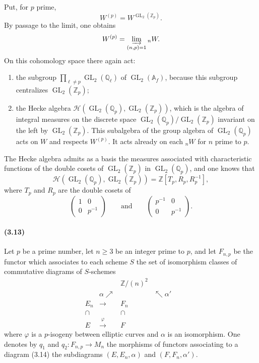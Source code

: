 \documentclass[10pt]{article}
\newcommand{\Af}{\mathbb A_f}
\newcommand{\Q}{\mathbb Q}
\newcommand{\Z}{\mathbb Z}
\newcommand{\GL}{\operatorname{GL}}
\newcommand{\cH}{\mathcal H}
\begin{document}
Put, for $p$ prime,
\[
W^{(p)}=W^{\GL_2(\Z_p)}.
\]
By passage to the limit, one obtains
\[
W^{(p)}=\varinjlim_{(n,p)=1}{}_nW.
\]
On this cohomology space there again act:
\begin{enumerate}[label=(\roman*)]
\item the subgroup $\prod_{\ell\ne p}\GL_2(\Q_\ell)$ of $\GL_2(\Af)$, because this subgroup
centralizes $\GL_2(\Z_p)$;
\item the Hecke algebra $\cH(\GL_2(\Q_p),\GL_2(\Z_p))$, which is the algebra of integral
measures on the discrete space $\GL_2(\Q_p)/\GL_2(\Z_p)$ invariant on the left by
$\GL_2(\Z_p)$. This subalgebra of the group algebra of $\GL_2(\Q_p)$ acts on $W$ and
respects $W^{(p)}$. It acts already on each ${}_nW$ for $n$ prime to $p$.
\end{enumerate}

The Hecke algebra admits as a basis the measures associated with characteristic functions
of the double cosets of $\GL_2(\Z_p)$ in $\GL_2(\Q_p)$, and one knows that
\[
\cH(\GL_2(\Q_p),\GL_2(\Z_p))=\Z[T_p,R_p,R_p^{-1}],
\]
where $T_p$ and $R_p$ are the double cosets of
\[
\begin{pmatrix}1&0\\0&p^{-1}\end{pmatrix}
\qquad\text{and}\qquad
\begin{pmatrix}p^{-1}&0\\0&p^{-1}\end{pmatrix}.
\]


\paragraph{(3.13)}
Let $p$ be a prime number, let $n\geq 3$ be an integer prime to $p$, and let $F_{n,p}$ be the functor which associates to each scheme $S$ the set of isomorphism classes of commutative diagrams of $S$-schemes
\[
\begin{array}{ccccc}
&& \Z/(n)^2 &&\\[-0.2em]
& \alpha\nearrow && \nwarrow\alpha' &\\[-0.2em]
E_n & \longrightarrow & F_n &&\\[-0.2em]
\cap && \cap &&\\[-0.2em]
E & \xrightarrow{\ \varphi\ } & F &&
\end{array}
\tag{3.14}
\]
where $\varphi$ is a $p$-isogeny between elliptic curves and $\alpha$ is an isomorphism. One denotes by $q_1$ and $q_2:F_{n,p}\to M_n$ the morphisms of functors associating to a diagram (3.14) the subdiagrams $(E,E_n,\alpha)$ and $(F,F_n,\alpha')$.
\end{document}
